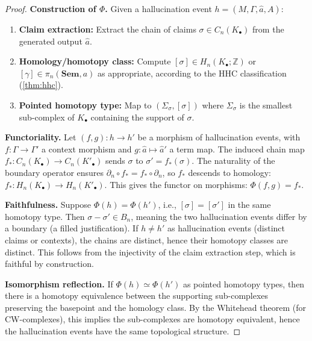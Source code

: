 \documentclass[11pt,a4paper]{article}
\theoremstyle{plain}
\theoremstyle{definition}
\theoremstyle{remark}
\newcommand{\Sem}{\mathbf{Sem}}
\newcommand{\Z}{\mathbb{Z}}
\begin{document}
\begin{proof}
\textbf{Construction of $\Phi$.} Given a hallucination event $h = (M, \Gamma, \hat{a}, A)$:
\begin{enumerate}
  \item \textbf{Claim extraction:} Extract the chain of claims $\sigma \in C_n(K_\bullet)$ from the generated output $\hat{a}$.
  \item \textbf{Homology/homotopy class:} Compute $[\sigma] \in H_n(K_\bullet; \Z)$ or $[\gamma] \in \pi_n(\Sem, a)$ as appropriate, according to the HHC classification (\cref{thm:hhc}).
  \item \textbf{Pointed homotopy type:} Map to $(\Sigma_\sigma, [\sigma])$ where $\Sigma_\sigma$ is the smallest sub-complex of $K_\bullet$ containing the support of $\sigma$.
\end{enumerate}

\textbf{Functoriality.} Let $(f, g): h \to h'$ be a morphism of hallucination events, with $f: \Gamma \to \Gamma'$ a context morphism and $g: \hat{a} \mapsto \hat{a}'$ a term map. The induced chain map $f_*: C_n(K_\bullet) \to C_n(K'_\bullet)$ sends $\sigma$ to $\sigma' = f_*(\sigma)$. The naturality of the boundary operator ensures $\partial_n \circ f_* = f_* \circ \partial_n$, so $f_*$ descends to homology: $f_*: H_n(K_\bullet) \to H_n(K'_\bullet)$. This gives the functor on morphisms: $\Phi(f, g) = f_*$.

\textbf{Faithfulness.} Suppose $\Phi(h) = \Phi(h')$, i.e., $[\sigma] = [\sigma']$ in the same homotopy type. Then $\sigma - \sigma' \in B_n$, meaning the two hallucination events differ by a boundary (a filled justification). If $h \neq h'$ as hallucination events (distinct claims or contexts), the chains are distinct, hence their homotopy classes are distinct. This follows from the injectivity of the claim extraction step, which is faithful by construction.

\textbf{Isomorphism reflection.} If $\Phi(h) \simeq \Phi(h')$ as pointed homotopy types, then there is a homotopy equivalence between the supporting sub-complexes preserving the basepoint and the homology class. By the Whitehead theorem (for CW-complexes), this implies the sub-complexes are homotopy equivalent, hence the hallucination events have the same topological structure.
\end{proof}


\end{document}
